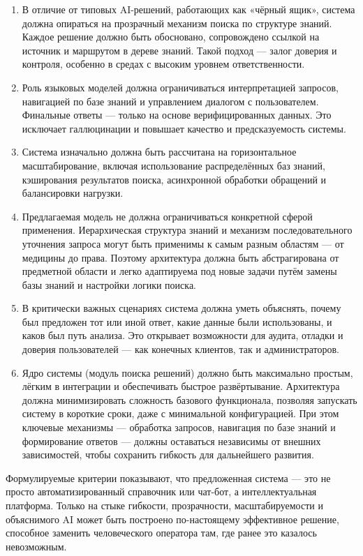 \begin{enumerate}[label=\arabic*]
    \item В отличие от типовых AI-решений, работающих как «чёрный ящик», система должна опираться на прозрачный механизм поиска по структуре знаний. Каждое решение должно быть обосновано, сопровождено ссылкой на источник и маршрутом в дереве знаний. Такой подход — залог доверия и контроля, особенно в средах с высоким уровнем ответственности.
    \item Роль языковых моделей должна ограничиваться интерпретацией запросов, навигацией по базе знаний и управлением диалогом с пользователем. Финальные ответы — только на основе верифицированных данных. Это исключает галлюцинации и повышает качество и предсказуемость системы.
    \item Система изначально должна быть рассчитана на горизонтальное масштабирование, включая использование распределённых баз знаний, кэширования результатов поиска, асинхронной обработки обращений и балансировки нагрузки.
    \item Предлагаемая модель не должна ограничиваться конкретной сферой применения. Иерархическая структура знаний и механизм последовательного уточнения запроса могут быть применимы к самым разным областям — от медицины до права. Поэтому архитектура должна быть абстрагирована от предметной области и легко адаптируема под новые задачи путём замены базы знаний и настройки логики поиска.
    \item В критически важных сценариях система должна уметь объяснять, почему был предложен тот или иной ответ, какие данные были использованы, и каков был путь анализа. Это открывает возможности для аудита, отладки и доверия пользователей — как конечных клиентов, так и администраторов.
    \item Ядро системы (модуль поиска решений) должно быть максимально простым, лёгким в интеграции и обеспечивать быстрое развёртывание. Архитектура должна минимизировать сложность базового функционала, позволяя запускать систему в короткие сроки, даже с минимальной конфигурацией. При этом ключевые механизмы — обработка запросов, навигация по базе знаний и формирование ответов — должны оставаться независимы от внешних зависимостей, чтобы сохранить гибкость для дальнейшего развития.
\end{enumerate}

Формулируемые критерии показывают, что предложенная система — это не просто автоматизированный справочник или чат-бот, а интеллектуальная платформа. Только на стыке гибкости, прозрачности, масштабируемости и объяснимого AI может быть построено по-настоящему эффективное решение, способное заменить человеческого оператора там, где ранее это казалось невозможным.

